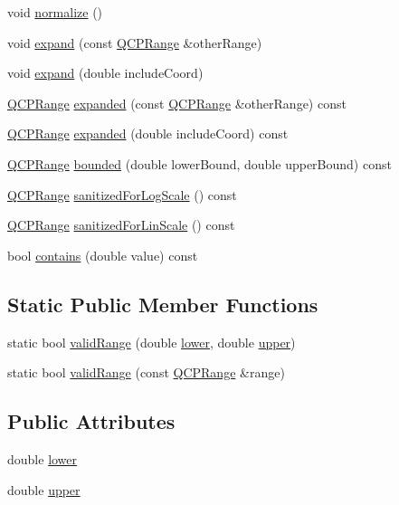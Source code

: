 \begin{DoxyCompactItemize}
\item 
void \hyperlink{class_q_c_p_range_af914a7740269b0604d0827c634a878a9}{normalize} ()
\item 
void \hyperlink{class_q_c_p_range_a0fa1bc8048be50d52bea93a8caf08305}{expand} (const \hyperlink{class_q_c_p_range}{Q\+C\+P\+Range} \&other\+Range)
\item 
void \hyperlink{class_q_c_p_range_a5fa977db0a4b7800075c629c62cf5e80}{expand} (double include\+Coord)
\item 
\hyperlink{class_q_c_p_range}{Q\+C\+P\+Range} \hyperlink{class_q_c_p_range_a9cbfb7cd06eac1839cae981e05c19633}{expanded} (const \hyperlink{class_q_c_p_range}{Q\+C\+P\+Range} \&other\+Range) const
\item 
\hyperlink{class_q_c_p_range}{Q\+C\+P\+Range} \hyperlink{class_q_c_p_range_af81d70f1add7233d73a19dcbe5decb2e}{expanded} (double include\+Coord) const
\item 
\hyperlink{class_q_c_p_range}{Q\+C\+P\+Range} \hyperlink{class_q_c_p_range_a22151e18d961d762d25721211e89c2e5}{bounded} (double lower\+Bound, double upper\+Bound) const
\item 
\hyperlink{class_q_c_p_range}{Q\+C\+P\+Range} \hyperlink{class_q_c_p_range_a3d66288d66e1d6df3636075eb42502ee}{sanitized\+For\+Log\+Scale} () const
\item 
\hyperlink{class_q_c_p_range}{Q\+C\+P\+Range} \hyperlink{class_q_c_p_range_a808751fdd9b17ef52327ba011df2e5f1}{sanitized\+For\+Lin\+Scale} () const
\item 
bool \hyperlink{class_q_c_p_range_ae9842b48b6d38dc5e9607358e3083cc8}{contains} (double value) const
\end{DoxyCompactItemize}
\subsection*{Static Public Member Functions}
\begin{DoxyCompactItemize}
\item 
static bool \hyperlink{class_q_c_p_range_ab38bd4841c77c7bb86c9eea0f142dcc0}{valid\+Range} (double \hyperlink{class_q_c_p_range_aa3aca3edb14f7ca0c85d912647b91745}{lower}, double \hyperlink{class_q_c_p_range_ae44eb3aafe1d0e2ed34b499b6d2e074f}{upper})
\item 
static bool \hyperlink{class_q_c_p_range_a801b964752eaad6219be9d8a651ec2b3}{valid\+Range} (const \hyperlink{class_q_c_p_range}{Q\+C\+P\+Range} \&range)
\end{DoxyCompactItemize}
\subsection*{Public Attributes}
\begin{DoxyCompactItemize}
\item 
double \hyperlink{class_q_c_p_range_aa3aca3edb14f7ca0c85d912647b91745}{lower}
\item 
double \hyperlink{class_q_c_p_range_ae44eb3aafe1d0e2ed34b499b6d2e074f}{upper}
\end{DoxyCompactItemize}

